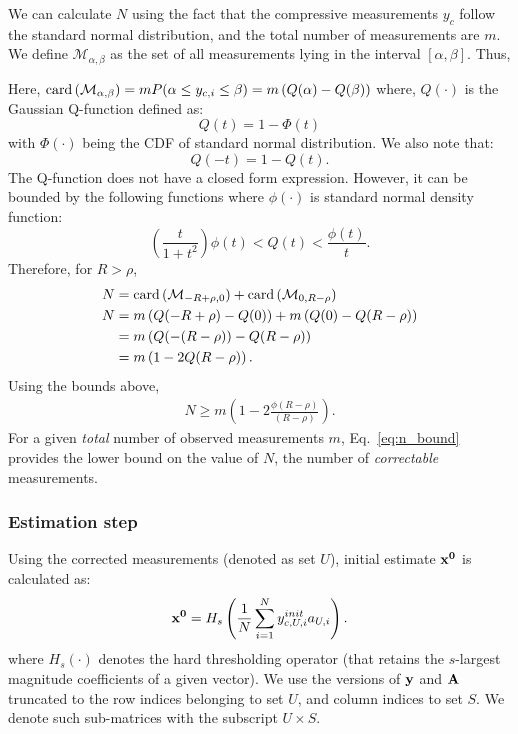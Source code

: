 We can calculate $N$ using the fact that the compressive measurements $y_c$ follow the standard normal distribution, and the total number of measurements are $m$. We define $\mathcal{M}_{\alpha,\beta}$ as the set of all measurements lying in the interval $[\alpha,\beta]$. Thus,

Here, $\mathrm{card}\left(\mathcal{M}_{\alpha,\beta}\right)=mP(\alpha \leq y_{c,i}\leq \beta) = m\left(Q(\alpha)- Q(\beta)\right)$
where, $Q(\cdot)$ is the Gaussian Q-function defined as:
$$Q(t) = 1-\Phi(t)$$ 
with $\Phi(\cdot)$ being the CDF of standard normal distribution. We also note that:
 $$Q(-t) = 1 - Q(t).$$
The Q-function does not have a closed form expression. However, it can be bounded by the following functions where $\phi(\cdot)$ is standard normal density function:
$$
\left(\frac{t}{1+t^2}\right)\phi(t) < Q(t) < \frac{\phi(t)}{t}.
$$
Therefore, for $R > \rho$,
\begin{align}
N & = \mathrm{card}\left(\mathcal{M}_{-R + \rho,0}\right) + \mathrm{card}\left(\mathcal{M}_{0, R-\rho}\right) \nonumber \\
N &  = m\left(Q(-R+\rho)- Q(0)\right) + m\left(Q(0)- Q(R-\rho)\right) \nonumber \\
& = m\left(Q(-(R-\rho))- Q(R-\rho)\right) \nonumber \\
& = m\left(1-2Q(R-\rho)\right). \nonumber
\end{align}
Using the bounds above,
\begin{align}
N \geq m \left(1-2\frac{\phi(R-\rho)}{(R-\rho)} \right).
\label{eq:n_bound}
\end{align}
%
For a given \emph{total} number of observed measurements $m$, Eq.~\ref{eq:n_bound} provides the lower bound on the value of $N$, the number of \emph{correctable} measurements.

\subsubsection{Estimation step}
Using the corrected measurements (denoted as set $U$), initial estimate $\mathbf{x^0}$ is calculated as:
$$
\mathbf{x^0} = H_s\left(\frac{1}{N}\sum_{i=1}^{N}y^{init}_{c,U,i}a_{U,i}\right).
$$
where $H_s(\cdot)$ denotes the hard thresholding operator (that retains the $s$-largest magnitude coefficients of a given vector).  We use the versions of $\mathbf{y}$ and $\mathbf{A}$ truncated to the row indices belonging to set $U$, and column indices to set $S$. We denote such sub-matrices with the subscript $U\times S$. 

